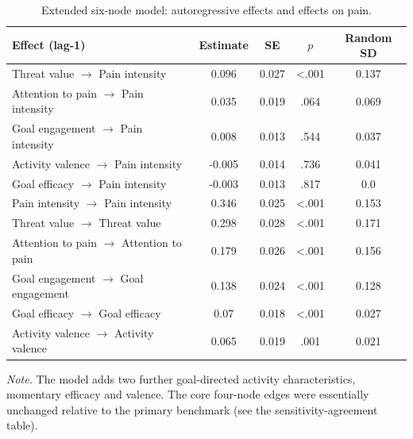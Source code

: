 \begin{table}[H]
\raggedright
\caption{Extended six-node model: autoregressive effects and effects on pain.}
\label{tab:sup-extended}
\scriptsize
\begingroup
\setlength{\tabcolsep}{4pt}
\renewcommand{\arraystretch}{1.08}
\noindent
\begin{tabular*}{\textwidth}{@{\extracolsep{\fill}}lcccc@{}}
\toprule
Effect (lag-1) & Estimate & SE & $p$ & Random SD \\
\midrule
Threat value $\rightarrow$ Pain intensity & 0.096 & 0.027 & <.001 & 0.137 \\
Attention to pain $\rightarrow$ Pain intensity & 0.035 & 0.019 & .064 & 0.069 \\
Goal engagement $\rightarrow$ Pain intensity & 0.008 & 0.013 & .544 & 0.037 \\
Activity valence $\rightarrow$ Pain intensity & -0.005 & 0.014 & .736 & 0.041 \\
Goal efficacy $\rightarrow$ Pain intensity & -0.003 & 0.013 & .817 & 0.0 \\
Pain intensity $\rightarrow$ Pain intensity & 0.346 & 0.025 & <.001 & 0.153 \\
Threat value $\rightarrow$ Threat value & 0.298 & 0.028 & <.001 & 0.171 \\
Attention to pain $\rightarrow$ Attention to pain & 0.179 & 0.026 & <.001 & 0.156 \\
Goal engagement $\rightarrow$ Goal engagement & 0.138 & 0.024 & <.001 & 0.128 \\
Goal efficacy $\rightarrow$ Goal efficacy & 0.07 & 0.018 & <.001 & 0.027 \\
Activity valence $\rightarrow$ Activity valence & 0.065 & 0.019 & .001 & 0.021 \\
\bottomrule
\end{tabular*}
\par\vspace{3pt}\noindent\parbox{\textwidth}{\scriptsize\textit{Note.} The model adds two further goal-directed activity characteristics, momentary efficacy and valence. The core four-node edges were essentially unchanged relative to the primary benchmark (see the sensitivity-agreement table).}
\endgroup
\end{table}
